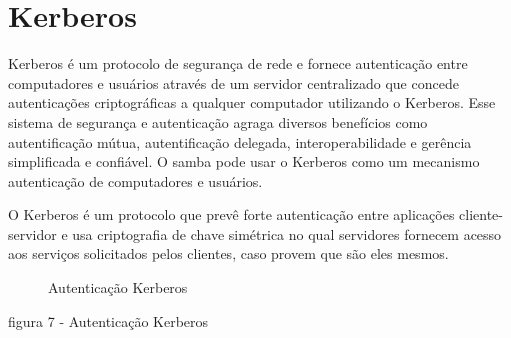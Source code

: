 \section{Kerberos}

Kerberos é um protocolo de segurança de rede e fornece autenticação entre computadores e usuários através de um servidor centralizado que concede autenticações criptográficas a qualquer computador utilizando o Kerberos. Esse sistema de segurança e autenticação agraga diversos benefícios como autentificação mútua, autentificação delegada, interoperabilidade e gerência simplificada e confiável. O samba pode usar o Kerberos como um mecanismo autenticação de computadores e usuários.

O Kerberos é um protocolo que prevê forte autenticação entre aplicações cliente-servidor e usa criptografia de chave simétrica no qual servidores fornecem acesso aos serviços solicitados pelos clientes, caso provem que são eles mesmos. \cite{FILHO}


 
\begin{figure}[ht]
   	\centering
   	\caption{Autenticação Kerberos \cite{KERBEROS}}
    \label{kerberos}
\end{figure}
figura 7 - Autenticação Kerberos \cite{KERBEROS}

